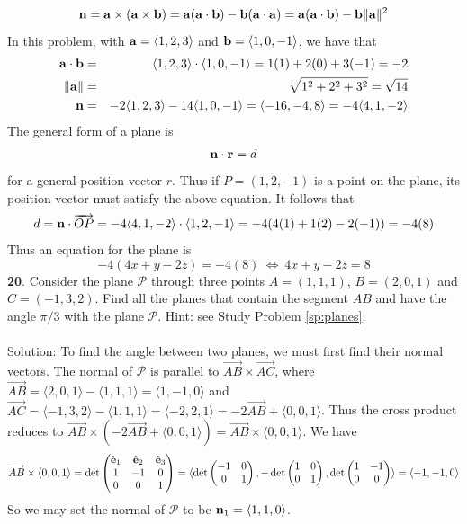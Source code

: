 \documentclass[12pt]{amsbook}
\let\cal\mathcal
\newcommand{\la}{\langle}
\newcommand{\ra}{\rangle}
\begin{document}
$${\bf n}={\bf a}\times({\bf a}\times{\bf b})={\bf a}({\bf a}\cdot{\bf b})-{\bf b}({\bf a}\cdot{\bf a})={\bf a}({\bf a}\cdot{\bf b})-{\bf b}\|{\bf a}\|^2$$
In this problem, with ${\bf a}=\la 1,2,3 \ra$ and ${\bf b}=\la 1,0,-1 \ra$, we have that
\begin{eqnarray*}
{\bf a}\cdot{\bf b}&=&\la 1,2,3 \ra \cdot \la 1,0,-1\ra=1(1)+2(0)+3(-1)=-2\\
\|{\bf a}\|&=&\sqrt{1^2+2^2+3^2}=\sqrt{14}\\
{\bf n}&=&-2\la 1,2,3\ra-14\la 1,0,-1\ra = \la -16,-4,8\ra=-4\la 4,1,-2\ra
\end{eqnarray*}
The general form of a plane is
$${\bf n}\cdot{\bf r}=d$$
for a general position vector $r$. Thus if $P=(1,2,-1)$ is a point on the plane, its position vector must satisfy the above equation. It follows that
$$d={\bf n}\cdot\overrightarrow{OP}=-4\la 4,1,-2 \ra\cdot\la 1,2,-1\ra=-4(4(1)+1(2)-2(-1))=-4(8)$$ 
Thus an equation for the plane is
$$-4(4x+y-2z)=-4(8) \ \Leftrightarrow \ 4x+y-2z=8 $$
{\small\bf 20}. Consider the plane ${\cal P}$ through three
points $A=(1,1,1)$, $B=(2,0,1)$ and $C=(-1,3,2)$.
Find all the planes that contain the segment $AB$
and have the angle $\pi/3$ with the plane ${\cal P}$.
Hint: see Study Problem \ref{sp:planes}.\\
\\
{\sc Solution}: To find the angle between two planes, we must first find their normal vectors. The normal of $\mathcal{P}$ is parallel to $\overrightarrow{AB}\times\overrightarrow{AC}$, where $\overrightarrow{AB}=\la 2,0,1 \ra - \la 1,1,1 \ra = \la 1,-1,0 \ra$ and $\overrightarrow{AC}=\la -1,3,2 \ra - \la 1,1,1 \ra = \la -2,2,1 \ra =-2\overrightarrow{AB}+\la 0,0,1 \ra$. Thus the cross product reduces to $\overrightarrow{AB}\times(-2\overrightarrow{AB}+\la 0,0,1 \ra)=\overrightarrow{AB}\times \la 0,0,1 \ra$. We have 
 $$\overrightarrow{AB}\times\la 0,0,1\ra=\det
\begin{pmatrix}
\hat{\bf e}_1 & \hat{\bf e}_2 & \hat{\bf e}_3\cr 1&-1&0\cr 0&0&1 \end{pmatrix}=\la \det\begin{pmatrix}-1&0\cr 0&1  \end{pmatrix}, -\det\begin{pmatrix}1&0\cr 0&1  \end{pmatrix}, \det\begin{pmatrix}1&-1\cr 0&0 \end{pmatrix} \ra = \la -1,-1,0 \ra$$
So we may set the normal of $\mathcal{P}$ to be ${\bf n}_1=\la 1,1,0\ra$. 
\\
\end{document}
